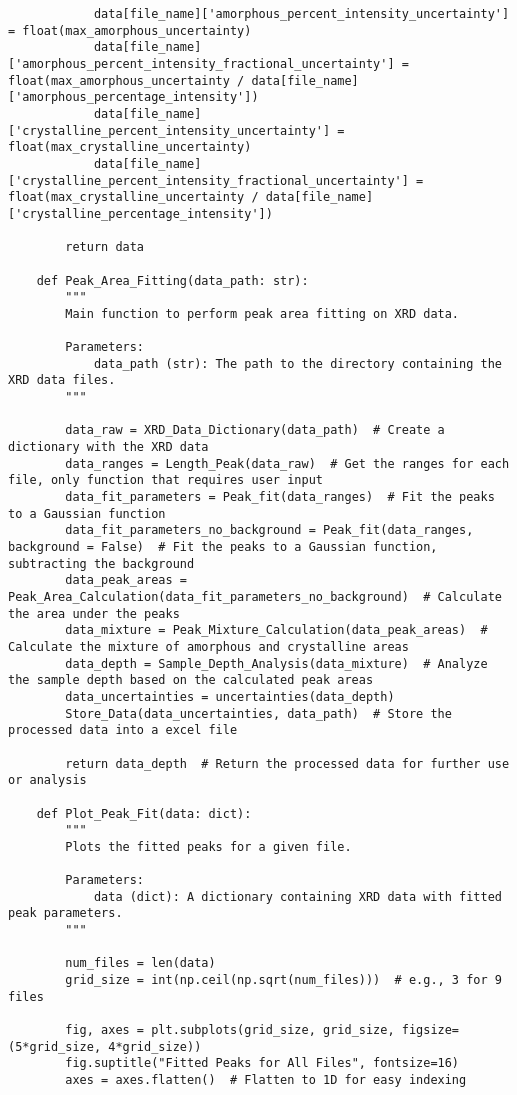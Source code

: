 \begin{lstlisting}
            data[file_name]['amorphous_percent_intensity_uncertainty'] = float(max_amorphous_uncertainty)
            data[file_name]['amorphous_percent_intensity_fractional_uncertainty'] = float(max_amorphous_uncertainty / data[file_name]['amorphous_percentage_intensity'])
            data[file_name]['crystalline_percent_intensity_uncertainty'] = float(max_crystalline_uncertainty)
            data[file_name]['crystalline_percent_intensity_fractional_uncertainty'] = float(max_crystalline_uncertainty / data[file_name]['crystalline_percentage_intensity'])

        return data
        
    def Peak_Area_Fitting(data_path: str):
        """
        Main function to perform peak area fitting on XRD data.

        Parameters:
            data_path (str): The path to the directory containing the XRD data files.
        """

        data_raw = XRD_Data_Dictionary(data_path)  # Create a dictionary with the XRD data
        data_ranges = Length_Peak(data_raw)  # Get the ranges for each file, only function that requires user input
        data_fit_parameters = Peak_fit(data_ranges)  # Fit the peaks to a Gaussian function
        data_fit_parameters_no_background = Peak_fit(data_ranges, background = False)  # Fit the peaks to a Gaussian function, subtracting the background
        data_peak_areas = Peak_Area_Calculation(data_fit_parameters_no_background)  # Calculate the area under the peaks
        data_mixture = Peak_Mixture_Calculation(data_peak_areas)  # Calculate the mixture of amorphous and crystalline areas
        data_depth = Sample_Depth_Analysis(data_mixture)  # Analyze the sample depth based on the calculated peak areas
        data_uncertainties = uncertainties(data_depth)
        Store_Data(data_uncertainties, data_path)  # Store the processed data into a excel file

        return data_depth  # Return the processed data for further use or analysis

    def Plot_Peak_Fit(data: dict):
        """
        Plots the fitted peaks for a given file.

        Parameters:
            data (dict): A dictionary containing XRD data with fitted peak parameters.
        """ 

        num_files = len(data)
        grid_size = int(np.ceil(np.sqrt(num_files)))  # e.g., 3 for 9 files

        fig, axes = plt.subplots(grid_size, grid_size, figsize=(5*grid_size, 4*grid_size))
        fig.suptitle("Fitted Peaks for All Files", fontsize=16)
        axes = axes.flatten()  # Flatten to 1D for easy indexing


\end{lstlisting}
